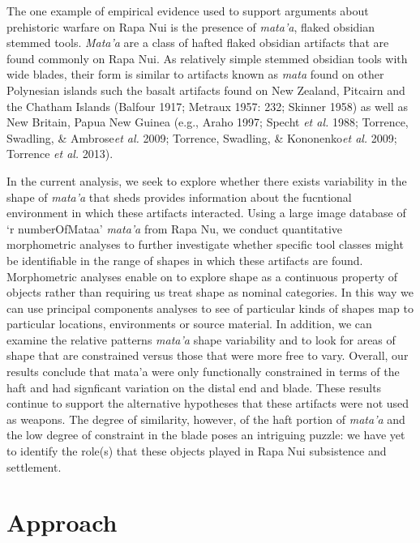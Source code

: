 \documentclass[]{article}
\begin{document}
The one example of empirical evidence used to support arguments about
prehistoric warfare on Rapa Nui is the presence of \emph{mata'a}, flaked
obsidian stemmed tools. \emph{Mata'a} are a class of hafted flaked
obsidian artifacts that are found commonly on Rapa Nui. As relatively
simple stemmed obsidian tools with wide blades, their form is similar to
artifacts known as \emph{mata} found on other Polynesian islands such
the basalt artifacts found on New Zealand, Pitcairn and the Chatham
Islands (Balfour 1917; Metraux 1957: 232; Skinner 1958) as well as New
Britain, Papua New Guinea (e.g., Araho 1997; Specht \emph{et al.} 1988;
Torrence, Swadling, \& Ambrose\emph{et al.} 2009; Torrence, Swadling, \&
Kononenko\emph{et al.} 2009; Torrence \emph{et al.} 2013).

In the current analysis, we seek to explore whether there exists
variability in the shape of \emph{mata'a} that sheds provides
information about the fucntional environment in which these artifacts
interacted. Using a large image database of `r numberOfMataa'
\emph{mata'a} from Rapa Nu, we conduct quantitative morphometric
analyses to further investigate whether specific tool classes might be
identifiable in the range of shapes in which these artifacts are found.
Morphometric analyses enable on to explore shape as a continuous
property of objects rather than requiring us treat shape as nominal
categories. In this way we can use principal components analyses to see
of particular kinds of shapes map to particular locations, environments
or source material. In addition, we can examine the relative patterns
\emph{mata'a} shape variability and to look for areas of shape that are
constrained versus those that were more free to vary. Overall, our
results conclude that mata'a were only functionally constrained in terms
of the haft and had signficant variation on the distal end and blade.
These results continue to support the alternative hypotheses that these
artifacts were not used as weapons. The degree of similarity, however,
of the haft portion of \emph{mata'a} and the low degree of constraint in
the blade poses an intriguing puzzle: we have yet to identify the
role(s) that these objects played in Rapa Nui subsistence and
settlement.

\section{Approach}\label{approach}
\end{document}
